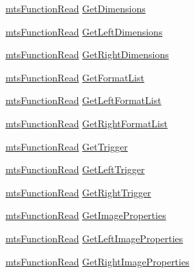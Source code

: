 \begin{DoxyCompactItemize}
\item 
\hyperlink{classmts_function_read}{mts\-Function\-Read} \hyperlink{class_i_req_filter_source_video_capture_a2aef6432030e6c1ec872c73a91622489}{Get\-Dimensions}
\item 
\hyperlink{classmts_function_read}{mts\-Function\-Read} \hyperlink{class_i_req_filter_source_video_capture_a1aefb74ebf1877ccbcdf89a6366c248b}{Get\-Left\-Dimensions}
\item 
\hyperlink{classmts_function_read}{mts\-Function\-Read} \hyperlink{class_i_req_filter_source_video_capture_a26413761bff0d0cf3ddc2b778c98affa}{Get\-Right\-Dimensions}
\item 
\hyperlink{classmts_function_read}{mts\-Function\-Read} \hyperlink{class_i_req_filter_source_video_capture_ac3026a5fc8bf911cf0a1dc2146e811af}{Get\-Format\-List}
\item 
\hyperlink{classmts_function_read}{mts\-Function\-Read} \hyperlink{class_i_req_filter_source_video_capture_ab6b58da067122b32245d7c89ad41be47}{Get\-Left\-Format\-List}
\item 
\hyperlink{classmts_function_read}{mts\-Function\-Read} \hyperlink{class_i_req_filter_source_video_capture_aee68db7930a53c1f5d39959850d18c32}{Get\-Right\-Format\-List}
\item 
\hyperlink{classmts_function_read}{mts\-Function\-Read} \hyperlink{class_i_req_filter_source_video_capture_a0436eb250f5e4432e01f809a1ca104e2}{Get\-Trigger}
\item 
\hyperlink{classmts_function_read}{mts\-Function\-Read} \hyperlink{class_i_req_filter_source_video_capture_a2bbe9cd5724989b3f2f86a824bb801db}{Get\-Left\-Trigger}
\item 
\hyperlink{classmts_function_read}{mts\-Function\-Read} \hyperlink{class_i_req_filter_source_video_capture_a784d756deb14f6e2e8b5b17adfbd43f0}{Get\-Right\-Trigger}
\item 
\hyperlink{classmts_function_read}{mts\-Function\-Read} \hyperlink{class_i_req_filter_source_video_capture_a642db47821c08a6fba6e73a55786257a}{Get\-Image\-Properties}
\item 
\hyperlink{classmts_function_read}{mts\-Function\-Read} \hyperlink{class_i_req_filter_source_video_capture_ab8d53564d42d21102b8c3deb3c6031c7}{Get\-Left\-Image\-Properties}
\item 
\hyperlink{classmts_function_read}{mts\-Function\-Read} \hyperlink{class_i_req_filter_source_video_capture_a004909aca70b016a7dda598a3a6ea8ae}{Get\-Right\-Image\-Properties}
\end{DoxyCompactItemize}


